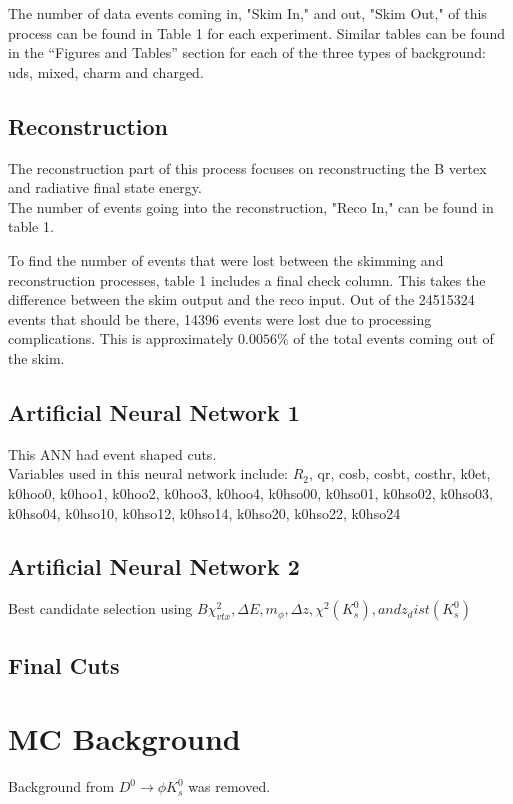 \documentclass[11pt]{article}
\begin{document}
\noindent
The number of data events coming in, "Skim In," and out, "Skim Out,"
of this process can be found in Table 1 for each experiment. Similar
tables can be found in the ``Figures and Tables'' section for each of
the three types of background: uds, mixed, charm and charged. 
\subsection{Reconstruction}

The reconstruction part of this process focuses on reconstructing the B
vertex and radiative final state energy.\\

\noindent
The number of events going into the reconstruction, "Reco In,"  can be
found in table 1.

\noindent
To find the number of events that were lost between the skimming and
reconstruction processes, table 1 includes a final check column. This takes the
difference between the skim output and the reco input. Out of the
24515324 events that should be there, 14396 events were lost due to
processing complications. This is approximately $0.0056\%$ of the total
events coming out of the skim.

\subsection{Artificial Neural Network 1}
This ANN had event shaped cuts.\\

Variables used in this neural network include: $R_2$, qr, cosb, cosbt,
costhr, k0et, k0hoo0, k0hoo1, k0hoo2, k0hoo3, k0hoo4, k0hso00, k0hso01,
k0hso02, k0hso03, k0hso04, k0hso10, k0hso12, k0hso14, k0hso20, k0hso22, k0hso24


\subsection{Artificial Neural Network 2}
Best candidate selection using $B \chi^{2}_{vtx}, \Delta
E, m_{\phi}, \Delta z, \chi^{2}(K^0_s), and z_dist(K^0_s)$
\subsection{Final Cuts}

\section{MC Background}
Background from $D^{0} \rightarrow \phi K^{0}_s$ was removed.
\end{document}
